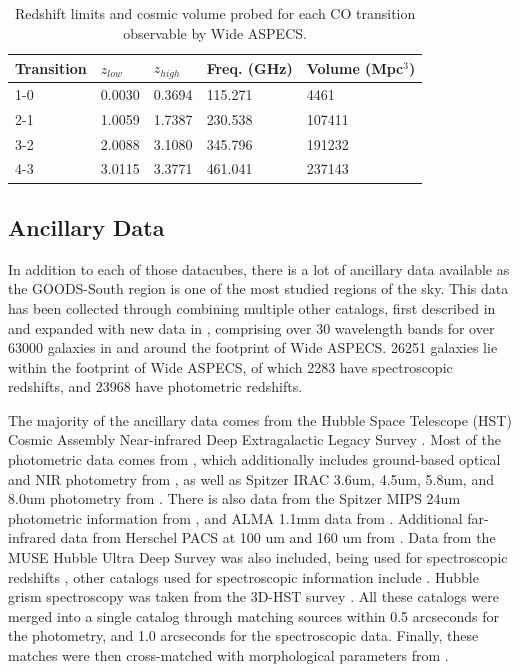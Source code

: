 \begin{table}[]
\caption{Redshift limits and cosmic volume probed for each CO transition observable by Wide ASPECS.}
\begin{tabular}{lllll}
Transition & $z_{low}$ & $z_{high}$ & Freq. (GHz) & Volume (Mpc$^3$) \\
\hline
1-0        & 0.0030    & 0.3694     & 115.271     & 4461             \\
2-1        & 1.0059    & 1.7387     & 230.538     & 107411           \\
3-2        & 2.0088    & 3.1080     & 345.796     & 191232           \\
4-3        & 3.0115    & 3.3771     & 461.041     & 237143          
\end{tabular}
\end{table}

\subsection{Ancillary Data}

In addition to each of those datacubes, there is a lot of ancillary data available as the GOODS-South region is one of the most studied regions of the sky. This data has been collected through combining multiple other catalogs, first described in \cite{walter2016alma} and expanded with new data in \cite{decarli2019alma}, comprising over 30 wavelength bands for over 63000 galaxies in and around the footprint of Wide ASPECS. 26251 galaxies lie within the footprint of Wide ASPECS, of which 2283 have spectroscopic redshifts, and 23968 have photometric redshifts. 

The majority of the ancillary data comes from the Hubble Space Telescope (HST) Cosmic Assembly Near-infrared Deep Extragalactic Legacy Survey \cite{grogin2011candels, Koekemoer_2011}. Most of the photometric data comes from \cite{skelton20143d}, which additionally includes ground-based optical and NIR photometry from \cite{nonino2009deep, hildebrandt2006gabods, erben2005gabods, retzlaff2010great, Hsieh_2012, 2008ApJ...682..985W, cardamone2010multiwavelength}, as well as Spitzer IRAC 3.6um, 4.5um, 5.8um, and 8.0um photometry from \cite{dickinson2003evolution, elbaz2011goods, 2013ApJ...769...80A}. There is also data from the Spitzer MIPS 24um photometric information from \cite{Whitaker_2014}, and ALMA 1.1mm data from \cite{franco2018goods}. Additional far-infrared data from Herschel PACS at 100 um and 160 um from \cite{elbaz2011goods}. Data from the MUSE Hubble Ultra Deep Survey \cite{bacon2017} was also included, being used for spectroscopic redshifts \cite{inami2017}, other catalogs used for spectroscopic information include \cite{le2005vimos, coe2006galaxies, skelton20143d, morris2015wfc3}. Hubble grism spectroscopy was taken from the 3D-HST survey \cite{momcheva20163d}.  All these catalogs were merged into a single catalog through matching sources within 0.5 arcseconds for the photometry, and 1.0 arcseconds for the spectroscopic data. Finally, these matches were then cross-matched with morphological parameters from \cite{van2012structural}.

